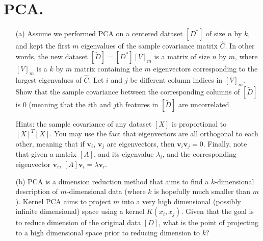 \documentclass[11pt]{article}
\renewcommand{\vec}[1]{\mathbf{#1}}
\begin{document}
\pagebreak

\section*{PCA.}

\begin{enumerate}
\item[(a)] Assume we performed PCA on a centered dataset $[D^*]$ of size $n$ by $k$, and kept the first $m$ eigenvalues of the sample covariance matrix $\hat{C}$.
In other words, the new dataset $[\tilde{D}] = [D^*] [V]_m$ is a matrix of size $n$ by $m$, where $[V]_m$ is a $k$ by $m$ matrix containing the $m$ eigenvectors corresponding to the largest eigenvalues
of $\hat{C}$.  Let $i$ and $j$ be different column indices in $[V]_m$.  Show that the sample covariance between the corresponding columns of $[\tilde{D}]$ is $0$ (meaning that the $i$th and $j$th features in $[\tilde{D}]$ are uncorrelated.

Hints: the sample covariance of any dataset $[X]$ is proportional to $[X]^T [X]$.  You may use the fact that eigenvectors are all orthogonal to each other, meaning that if $\vec{v}_i$, $\vec{v}_j$ are eigenvectors, then $\vec{v}_i \vec{v}_j = 0$.  Finally, note that given a matrix $[A]$, and its eigenvalue $\lambda_i$, and the corresponding eigenvector $\vec{v}_i$, $[A] \vec{v}_i = \lambda \vec{v}_i$.

\item[(b)] PCA is a dimension reduction method that aims to find a $k$-dimensional description of $m$-dimensional data (where $k$ is hopefully much smaller than $m$).
Kernel PCA aims to project $m$ into a very high dimensional (possibly infinite dimensional) space using a kernel $K(x_i,x_j)$.  Given that the goal is to reduce dimension of the
original data $[D]$, what is the point of projecting to a high dimensional space prior to reducing dimension to $k$?

\end{enumerate}
\end{document}
